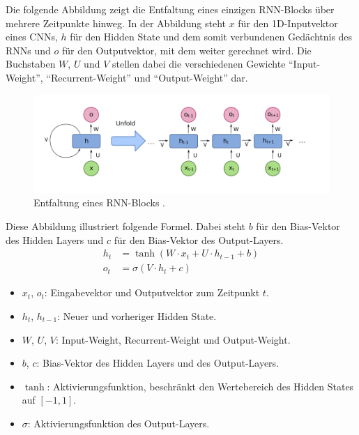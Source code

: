 Die folgende Abbildung zeigt die Entfaltung eines einzigen RNN-Blocks über mehrere Zeitpunkte hinweg.
In der Abbildung steht $x$ für den 1D-Inputvektor eines CNNs,
$h$ für den Hidden State und dem somit verbundenen Gedächtnis des RNNs
und $o$ für den Outputvektor, mit dem weiter gerechnet wird.
Die Buchstaben $W$, $U$ und $V$ stellen dabei die verschiedenen
Gewichte \enquote{Input-Weight}, \enquote{Recurrent-Weight} und \enquote{Output-Weight} dar.
\begin{figure}[H]
    \centering
    \includegraphics[width=1\textwidth]{Graphics/rnn_unfold}
    \caption[Entfaltung eines RNN-Blocks]{Entfaltung eines RNN-Blocks  \cite{wikimediaRNN}.}
    \label{fig:rnn_block_unfold}
\end{figure}
Diese Abbildung illustriert folgende Formel.
Dabei steht $b$ für den Bias-Vektor des Hidden Layers und $c$ für den Bias-Vektor des Output-Layers.
\begin{align*}
h_t &= \tanh\left( W \cdot x_t + U \cdot h_{t-1} + b \right) \\
o_t &= \sigma\left( V \cdot h_t + c \right)
\end{align*}
\begin{itemize}
    \item $x_t$, $o_t$: Eingabevektor und Outputvektor zum Zeitpunkt $t$.
    \item $h_t$, $h_{t-1}$: Neuer und vorheriger Hidden State.
    \item $W$, $U$, $V$: Input-Weight, Recurrent-Weight und Output-Weight.
    \item $b$, $c$: Bias-Vektor des Hidden Layers und des Output-Layers.
    \item $\tanh$: Aktivierungsfunktion, beschränkt den Wertebereich des Hidden States auf $[-1, 1]$.
    \item $\sigma$: Aktivierungsfunktion des Output-Layers.
\end{itemize}

